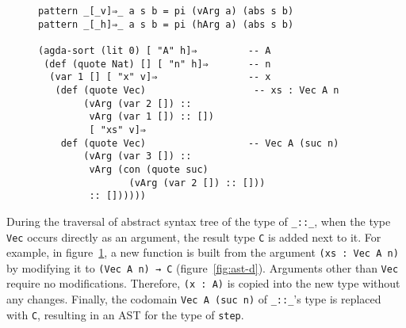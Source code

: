 \documentclass[runningheads]{llncs}
\begin{document}
\begin{figure}
\centering
\begingroup
\fontsize{7.9pt}{8pt}\selectfont
\begin{Verbatim}
pattern _[_v]⇒_ a s b = pi (vArg a) (abs s b)
pattern _[_h]⇒_ a s b = pi (hArg a) (abs s b)

(agda-sort (lit 0) [ "A" h]⇒         -- A
 (def (quote Nat) [] [ "n" h]⇒       -- n
  (var 1 [] [ "x" v]⇒                -- x
   (def (quote Vec)                   -- xs : Vec A n
        (vArg (var 2 []) ::
         vArg (var 1 []) :: [])
         [ "xs" v]⇒
    def (quote Vec)                  -- Vec A (suc n)
        (vArg (var 3 []) ::
         vArg (con (quote suc)
                (vArg (var 2 []) :: []))
         :: [])))))

\end{Verbatim}
\endgroup
{}
\label{fig:ast-g}
\end{figure}

During the traversal of abstract syntax tree of the type of {\tt \_::\_}, when the type {\tt Vec} occurs directly as an argument, the result type {\tt C} is added next to it.
For example, in figure~\ref{fig:ast-g}, a new function is built from the argument {\tt (xs : Vec A n)} by modifying it to {\tt (Vec A n) → C} (figure~\ref{fig:ast-d}).
Arguments other than \texttt{Vec} require no modifications.
Therefore, {\tt (x : A)} is copied into the new type without any changes.
Finally, the codomain \texttt{Vec A (suc n)} of {\tt \_::\_}'s type is replaced with \texttt{C}, resulting in an AST for the type of {\tt step}.
%
\end{document}
